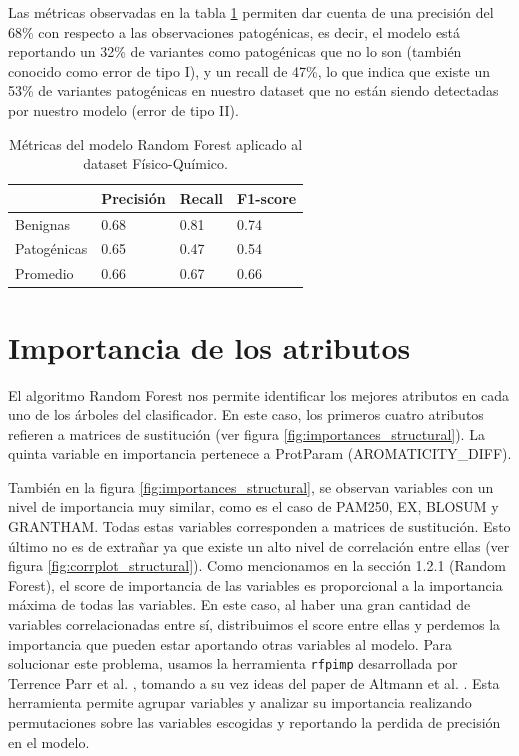 Las métricas observadas en la tabla \ref{structural_table} permiten dar cuenta de una precisión del 68\% con respecto a las observaciones patogénicas, es decir, el modelo está reportando un 32\% de variantes como patogénicas que no lo son (también conocido como error de tipo I), y un recall de 47\%, lo que indica que existe un 53\% de variantes patogénicas en nuestro dataset que no están siendo detectadas por nuestro modelo (error de tipo II). 

\begin{table}[H]
\centering
\begin{tabular}{|l|l|l|l|}
\hline
              & Precisión & Recall & F1-score \\ \hline
Benignas      & 0.68      & 0.81   & 0.74     \\ \hline
Patogénicas   & 0.65      & 0.47   & 0.54     \\ \hline
Promedio      & 0.66      & 0.67   & 0.66     \\ \hline
\end{tabular}
\caption{Métricas del modelo Random Forest aplicado al dataset Físico-Químico.}
\label{structural_table}
\end{table}


\section{Importancia de los atributos}

El algoritmo Random Forest nos permite identificar los mejores atributos en cada uno de los árboles del clasificador. En este caso, los primeros cuatro atributos refieren a matrices de sustitución (ver figura \ref{fig:importances_structural}). La quinta variable en importancia pertenece a ProtParam (AROMATICITY\_DIFF). 

También en la figura \ref{fig:importances_structural}, se observan variables con un nivel de importancia muy similar, como es el caso de PAM250, EX, BLOSUM y GRANTHAM. Todas estas variables corresponden a matrices de sustitución. Esto último no es de extrañar ya que existe un alto nivel de correlación entre ellas (ver figura \ref{fig:corrplot_structural}). Como mencionamos en la sección 1.2.1 (Random Forest), el score de importancia de las variables es proporcional a la importancia máxima de todas las variables. En este caso, al haber una gran cantidad de variables correlacionadas entre sí, distribuimos el score entre ellas y perdemos la importancia que pueden estar aportando otras variables al modelo. Para solucionar este problema, usamos la herramienta \texttt{rfpimp} desarrollada por Terrence Parr et al. \cite{rfpimp}, tomando a su vez ideas del paper de Altmann et al. \cite{Altmann2010}. Esta herramienta permite agrupar variables y analizar su importancia realizando permutaciones sobre las variables escogidas y reportando la perdida de precisión en el modelo. 

